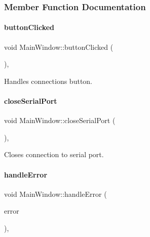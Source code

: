 \subsubsection{Member Function Documentation}
\mbox{\label{classMainWindow_a922a5c49b11ae3ec01663b409cfc35c1}} 
\paragraph{\texorpdfstring{button\+Clicked}{buttonClicked}}
{\footnotesize\ttfamily void Main\+Window\+::button\+Clicked (\begin{DoxyParamCaption}{ }\end{DoxyParamCaption})\hspace{0.3cm}{\ttfamily [private]}, {\ttfamily [slot]}}



Handles connection\textquotesingle{}s button. 

\mbox{\label{classMainWindow_ac5eae1a5faf30bb616185aa3be724484}} 
\paragraph{\texorpdfstring{close\+Serial\+Port}{closeSerialPort}}
{\footnotesize\ttfamily void Main\+Window\+::close\+Serial\+Port (\begin{DoxyParamCaption}{ }\end{DoxyParamCaption})\hspace{0.3cm}{\ttfamily [private]}, {\ttfamily [slot]}}



Closes connection to serial port. 

\mbox{\label{classMainWindow_a19690cb09dbe0abd4252c6b8236d6810}} 
\paragraph{\texorpdfstring{handle\+Error}{handleError}}
{\footnotesize\ttfamily void Main\+Window\+::handle\+Error (\begin{DoxyParamCaption}\item[{Q\+Serial\+Port\+::\+Serial\+Port\+Error}]{error }\end{DoxyParamCaption})\hspace{0.3cm}{\ttfamily [private]}, {\ttfamily [slot]}}



